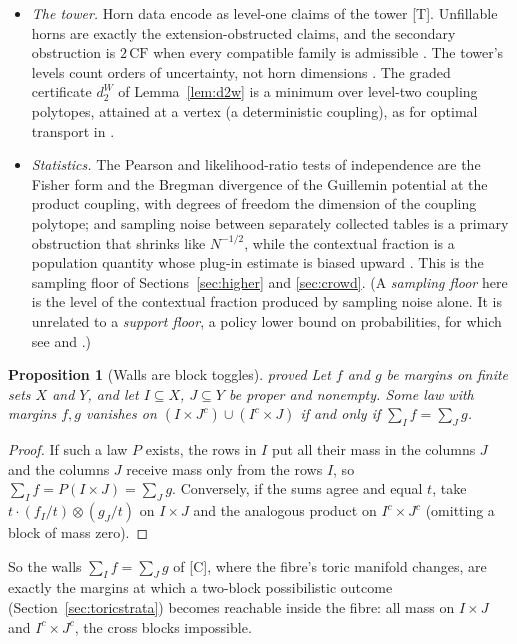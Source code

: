 \documentclass[11pt]{article}
\newtheorem{proposition}[theorem]{Proposition}
\theoremstyle{definition}
\theoremstyle{remark}
\newcommand{\CF}{\mathrm{CF}}
\newcommand{\src}[1]{\textsf{\small[#1]}}
\newcommand{\st}[1]{\textsf{\small\color{gray}#1}}
\begin{document}
\begin{itemize}
  \item \emph{The tower.} Horn data encode as level-one claims of the tower \src{T}. Unfillable horns are exactly the extension-obstructed claims, and the secondary obstruction is $2\,\CF$ when every compatible family is admissible \cite[Thm.~11.2]{awasthiC}. The tower's levels count orders of uncertainty, not horn dimensions \cite[Cor.~11.3]{awasthiC}. The graded certificate $d_2^W$ of Lemma~\ref{lem:d2w} is a minimum over level-two coupling polytopes, attained at a vertex (a deterministic coupling), as for optimal transport in \cite[Prop.~6.4]{awasthiF}.
  \item \emph{Statistics.} The Pearson and likelihood-ratio tests of independence are the Fisher form and the Bregman divergence of the Guillemin potential at the product coupling, with degrees of freedom the dimension of the coupling polytope; and sampling noise between separately collected tables is a primary obstruction that shrinks like $N^{-1/2}$, while the contextual fraction is a population quantity whose plug-in estimate is biased upward \cite[\S12]{awasthiC}. This is the sampling floor of Sections~\ref{sec:higher} and \ref{sec:crowd}. (A \emph{sampling floor} here is the level of the contextual fraction produced by sampling noise alone. It is unrelated to a \emph{support floor}, a policy lower bound on probabilities, for which see \cite[Def.~4.6, Thm.~4.8]{awasthiC} and \cite[Thm.~10.26]{awasthiT}.)
\end{itemize}

\begin{proposition}[Walls are block toggles]\label{prop:walltoggle}\st{proved}
Let $f$ and $g$ be margins on finite sets $X$ and $Y$, and let $I\subseteq X$, $J\subseteq Y$ be proper and nonempty. Some law with margins $f,g$ vanishes on $(I\times J^c)\cup(I^c\times J)$ if and only if $\sum_If=\sum_Jg$.
\end{proposition}
\begin{proof}
If such a law $P$ exists, the rows in $I$ put all their mass in the columns $J$ and the columns $J$ receive mass only from the rows $I$, so $\sum_If=P(I\times J)=\sum_Jg$. Conversely, if the sums agree and equal $t$, take $t\cdot(f_I/t)\otimes(g_J/t)$ on $I\times J$ and the analogous product on $I^c\times J^c$ (omitting a block of mass zero).
\end{proof}
So the walls $\sum_If=\sum_Jg$ of \src{C}, where the fibre's toric manifold changes, are exactly the margins at which a two-block possibilistic outcome (Section~\ref{sec:toricstrata}) becomes reachable inside the fibre: all mass on $I\times J$ and $I^c\times J^c$, the cross blocks impossible.
\end{document}
